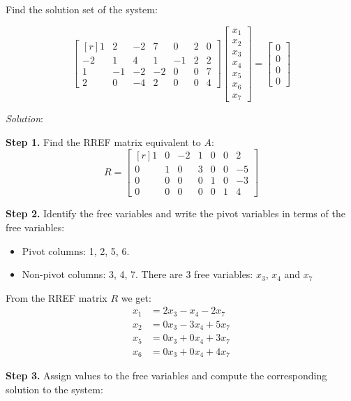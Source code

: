 \documentclass[12pt]{article}
\begin{document}
\begin{example} Find the solution set of the system:

\[
\left[\begin{matrix*}[r]1 & 2 & -2 & 7 & 0 & 2 & 0\\-2 & 1 & 4 & 1 & -1 & 2 & 2\\1 & -1 & -2 & -2 & 0 & 0 & 7\\2 & 0 & -4 & 2 & 0 & 0 & 4\end{matrix*}\right]
\begin{bmatrix}x_1\\x_2\\x_3\\x_4\\x_5\\x_6\\x_7\end{bmatrix}=
\begin{bmatrix}0\\0\\0\\0\end{bmatrix}
\]

\emph{Solution}: 

\textbf{Step 1.} Find the RREF matrix equivalent to $A$:
\[
R=\left[\begin{matrix*}[r]1 & 0 & -2 & 1 & 0 & 0 & 2\\0 & 1 & 0 & 3 & 0 & 0 & -5\\0 & 0 & 0 & 0 & 1 & 0 & -3\\0 & 0 & 0 & 0 & 0 & 1 & 4\end{matrix*}\right]
\]

\textbf{Step 2.}
Identify the free variables and write the pivot variables in terms of the free variables:
\begin{itemize}
\item Pivot columns: 1, 2, 5, 6.
\item Non-pivot columns: 3, 4, 7. There are 3 free variables: $x_3$, $x_4$ and $x_7$
\end{itemize}
From the RREF matrix $R$ we get:
\begin{align*}
x_1 &= 2x_3-x_4-2x_7\\
x_2 &= 0x_3-3x_4+5x_7\\
x_5 &= 0x_3+0x_4+3x_7\\
x_6 &= 0x_3+0x_4+4x_7
\end{align*}

\textbf{Step 3.}
Assign values to the free variables and compute the corresponding solution to the system:


\end{example}
\end{document}
